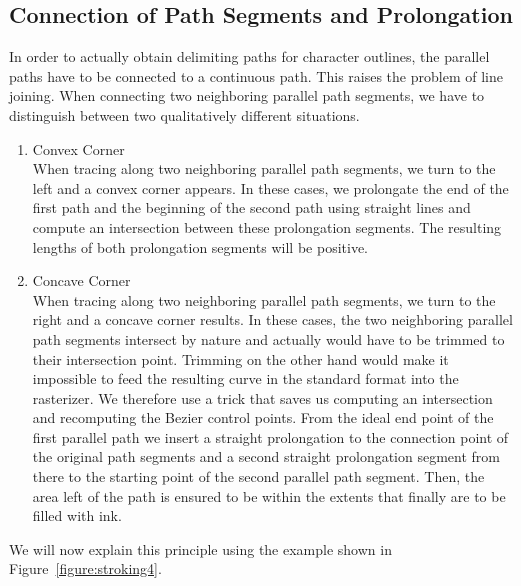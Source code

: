 \subsection{Connection of Path Segments and Prolongation}
\label{connectingpaths}
In order to actually obtain delimiting paths for character outlines, the
parallel paths have to be connected to a continuous path. This raises the
problem of line joining. When connecting two neighboring parallel path
segments, we have to distinguish between two qualitatively different
situations. 
\begin{enumerate}
\item Convex Corner\\
  When tracing along two neighboring parallel path segments, we turn to the
  left and a convex corner appears. In these cases, we prolongate the end of
  the first path and the beginning of the second path using straight lines and
  compute an intersection between these prolongation segments. The resulting
  lengths of both prolongation segments will be positive.
\item Concave Corner\\
  When tracing along two neighboring parallel path segments, we turn to the
  right and a concave corner results. In these cases, the two neighboring
  parallel path segments intersect by nature and actually would have to be
  trimmed to their intersection point. Trimming on the other hand would make
  it impossible to feed the resulting curve in the standard format into the
  rasterizer. We therefore use a trick that saves us computing an intersection
  and recomputing the Bezier control points. From the ideal end point of the
  first parallel path we insert a straight prolongation to the connection
  point of the original path segments and a second straight prolongation
  segment from there to the starting point of the second parallel path
  segment. Then, the area left of the path is ensured to be within the extents
  that finally are to be filled with ink. 
\end{enumerate}
We will now explain this principle using the example shown in
Figure~\ref{figure:stroking4}. 

